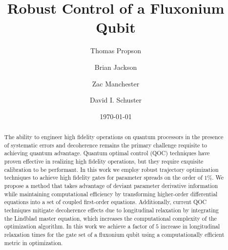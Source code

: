 \documentclass[
  amsfonts,
  amsmath,
  tbtags,
  amssymb,
  aps,
  nobibnotes,
  twocolumn,
  superscriptaddress,
]{revtex4-2}
\begin{document}
\title{Robust Control of a Fluxonium Qubit}

\author{Thomas Propson}
\author{Brian Jackson}
\author{Zac Manchester}
\author{David I. Schuster}

\date{\today}


\begin{abstract}
  The ability to engineer high fidelity operations on quantum processors in the presence of
  systematic errors and decoherence remains the primary challenge requisite to achieving quantum advantage.
  Quantum optimal control (QOC) techniques have proven effective in realizing high fidelity operations,
  but they require exquisite calibration to be performant.
  In this work we employ robust trajectory optimization techniques
  to achieve high fidelity gates for parameter spreads on the order of $1\%$. We propose a method that
  takes advantage of deviant parameter derivative information while maintaining
  computational efficiency by transforming
  higher-order differential equations into a set of coupled first-order equations.
  Additionally, current QOC techniques mitigate decoherence effects due to longitudinal relaxation by integrating
  the Lindblad master equation, which increases the computational complexity
  of the optimization algorithm.
  In this work we achieve a factor of $5$ increase in longitudinal relaxation times
  for the gate set of a fluxonium qubit
  using a computationally efficient metric in optimization.
\end{abstract}

\maketitle


\end{document}
